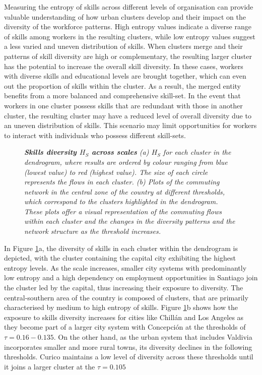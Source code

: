 \documentclass[11pt, a4paper]{article}
\begin{document}
Measuring the entropy of skills across different levels of organisation can provide valuable understanding of how urban clusters develop and their impact on the diversity of the workforce patterns. High entropy values indicate a diverse range of skills among workers in the resulting clusters, while low entropy values suggest a less varied and uneven distribution of skills. When clusters merge and their patterns of skill diversity are high or complementary, the resulting larger cluster has the potential to increase the overall skill diversity. In these cases, workers with diverse skills and educational levels are brought together, which can even out the proportion of skills within the cluster. As a result, the merged entity benefits from a more balanced and comprehensive skill-set. In the event that workers in one cluster possess skills that are redundant with those in another cluster, the resulting cluster may have a reduced level of overall diversity due to an uneven distribution of skills. This scenario may limit opportunities for workers to interact with individuals who possess different skill-sets.

\begin{figure}[h!]
\centering
{}
\caption{\textit{\textbf{Skills diversity $H_{S}$ across scales} (a) $H_{S}$ for each cluster in the dendrogram, where results are ordered by colour ranging from blue (lowest value) to red (highest value). The size of each circle represents the flows in each cluster. (b) Plots of the commuting network in the central zone of the country at different thresholds, which correspond to the clusters highlighted in the dendrogram. These plots offer a visual representation of the commuting flows within each cluster and the changes in the diversity patterns and the network structure as the threshold increases.}}
\label{skills}
\end{figure}

In Figure \ref{skills}a, the diversity of skills in each cluster within the dendrogram is depicted, with the cluster containing the capital city exhibiting the highest entropy levels. As the scale increases, smaller city systems with predominantly low entropy and a high dependency on employment opportunities in Santiago join the cluster led by the capital, thus increasing their exposure to diversity. The central-southern area of the country is composed of clusters, that are primarily characterised by medium to high entropy of skills. Figure \ref{skills}b shows how the exposure to skills diversity increases for cities like Chill\'an and Los Angeles as they become part of a larger city system with Concepci\'on at the thresholds of $\tau= 0.16-0.135$. On the other hand, as the urban system that includes Valdivia incorporates smaller and more rural towns, its diversity declines in the following thresholds. Curico maintains a low level of diversity across these thresholds until it joins a larger cluster at the $\tau=0.105$
\end{document}
